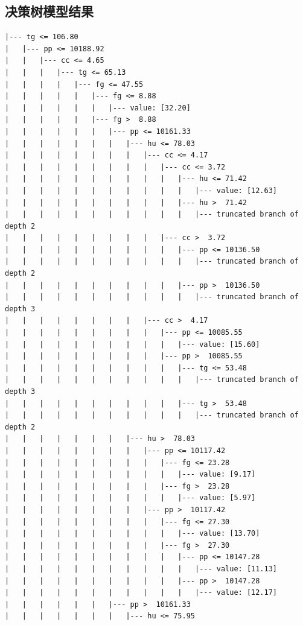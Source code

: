 \documentclass[UTF8, a4paper]{ctexart}
\begin{document}
\subsection{决策树模型结果}\label{tree_result}
\begin{lstlisting}
|--- tg <= 106.80
|   |--- pp <= 10188.92
|   |   |--- cc <= 4.65
|   |   |   |--- tg <= 65.13
|   |   |   |   |--- fg <= 47.55
|   |   |   |   |   |--- fg <= 8.88
|   |   |   |   |   |   |--- value: [32.20]
|   |   |   |   |   |--- fg >  8.88
|   |   |   |   |   |   |--- pp <= 10161.33
|   |   |   |   |   |   |   |--- hu <= 78.03
|   |   |   |   |   |   |   |   |--- cc <= 4.17
|   |   |   |   |   |   |   |   |   |--- cc <= 3.72
|   |   |   |   |   |   |   |   |   |   |--- hu <= 71.42
|   |   |   |   |   |   |   |   |   |   |   |--- value: [12.63]
|   |   |   |   |   |   |   |   |   |   |--- hu >  71.42
|   |   |   |   |   |   |   |   |   |   |   |--- truncated branch of depth 2
|   |   |   |   |   |   |   |   |   |--- cc >  3.72
|   |   |   |   |   |   |   |   |   |   |--- pp <= 10136.50
|   |   |   |   |   |   |   |   |   |   |   |--- truncated branch of depth 2
|   |   |   |   |   |   |   |   |   |   |--- pp >  10136.50
|   |   |   |   |   |   |   |   |   |   |   |--- truncated branch of depth 3
|   |   |   |   |   |   |   |   |--- cc >  4.17
|   |   |   |   |   |   |   |   |   |--- pp <= 10085.55
|   |   |   |   |   |   |   |   |   |   |--- value: [15.60]
|   |   |   |   |   |   |   |   |   |--- pp >  10085.55
|   |   |   |   |   |   |   |   |   |   |--- tg <= 53.48
|   |   |   |   |   |   |   |   |   |   |   |--- truncated branch of depth 3
|   |   |   |   |   |   |   |   |   |   |--- tg >  53.48
|   |   |   |   |   |   |   |   |   |   |   |--- truncated branch of depth 2
|   |   |   |   |   |   |   |--- hu >  78.03
|   |   |   |   |   |   |   |   |--- pp <= 10117.42
|   |   |   |   |   |   |   |   |   |--- fg <= 23.28
|   |   |   |   |   |   |   |   |   |   |--- value: [9.17]
|   |   |   |   |   |   |   |   |   |--- fg >  23.28
|   |   |   |   |   |   |   |   |   |   |--- value: [5.97]
|   |   |   |   |   |   |   |   |--- pp >  10117.42
|   |   |   |   |   |   |   |   |   |--- fg <= 27.30
|   |   |   |   |   |   |   |   |   |   |--- value: [13.70]
|   |   |   |   |   |   |   |   |   |--- fg >  27.30
|   |   |   |   |   |   |   |   |   |   |--- pp <= 10147.28
|   |   |   |   |   |   |   |   |   |   |   |--- value: [11.13]
|   |   |   |   |   |   |   |   |   |   |--- pp >  10147.28
|   |   |   |   |   |   |   |   |   |   |   |--- value: [12.17]
|   |   |   |   |   |   |--- pp >  10161.33
|   |   |   |   |   |   |   |--- hu <= 75.95

\end{lstlisting}
\end{document}
